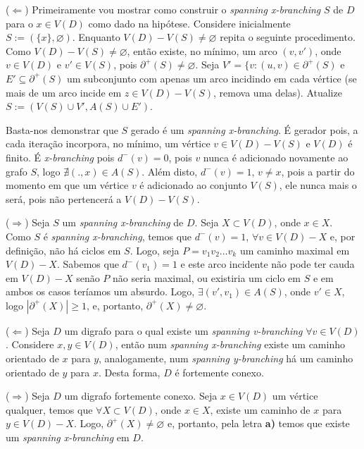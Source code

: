 
($\Leftarrow$) Primeiramente vou mostrar como construir o {\it spanning x-branching} $S$ de $D$ para o $x \in V(D)$ como dado na hipótese.
%
Considere inicialmente $S := (\{x\}, \varnothing)$.
%
Enquanto $V(D)-V(S) \ne \varnothing$ repita o seguinte procedimento.
%
Como $V(D)-V(S) \ne \varnothing$, então existe, no mínimo, um arco $(v,v')$, onde $v \in V(D)$ e $v' \in V(S)$, pois $\partial^+(S) \ne \varnothing$.
%
Seja $V' = \{v: (u,v) \in \partial^+(S)$ e $E' \subseteq \partial^+(S)$ um subconjunto com apenas um arco incidindo em cada vértice (se mais de um arco incide em $z \in V(D)-V(S)$, remova uma delas).
%
Atualize $S := (V(S)\cup V', A(S) \cup E')$.

Basta-nos demonstrar que $S$ gerado é um {\it spanning x-branching}.
%
É gerador pois, a cada iteração incorpora, no mínimo, um vértice $v \in V(D)-V(S)$ e $V(D)$ é finito.
%
É {\it x-branching} pois $d^-(v) = 0$, pois $v$ nunca é adicionado novamente ao grafo $S$, logo $\nexists (.,x) \in A(S)$.
%
Além disto, $d^-(v) = 1$, $v\ne x$, pois a partir do momento em que um vértice $v$ é adicionado ao conjunto $V(S)$, ele nunca mais o será, pois não pertencerá a $V(D)-V(S)$.

($\Rightarrow$) Seja $S$ um {\it spanning x-branching} de $D$.
%
Seja $X \subset V(D)$, onde $x \in X$. Como $S$ é {\it spanning x-branching}, temos que $d^-(v) = 1$, $\forall v \in V(D)-X$ e, por definição, não há ciclos em $S$.
%
Logo, seja $P = v_1v_2\ldots v_k$ um caminho maximal em $V(D) - X$. Sabemos que $d^-(v_1) = 1$ e este arco incidente não pode ter cauda em $V(D) - X$ senão $P$ não seria maximal, ou existiria um ciclo em $S$ e em ambos os casos teríamos um absurdo.
%
Logo, $\exists (v',v_1) \in A(S)$, onde $v' \in X$, logo $|\partial^+(X)| \ge 1$, e, portanto, $\partial^+(X) \ne \varnothing$.
\fimprova

 ($\Leftarrow$) Seja $D$ um digrafo para o qual existe um {\it spanning v-branching} $\forall v \in V(D)$.
%
Considere $x,y \in V(D)$, então num {\it spanning x-branching} existe um caminho orientado de $x$ para $y$, analogamente, num {\it spanning y-branching} há um caminho orientado de $y$ para $x$.
%
Desta forma, $D$ é fortemente conexo.

($\Rightarrow$) Seja $D$ um digrafo fortemente conexo.
%
Seja $x \in V(D)$ um vértice qualquer, temos que $\forall X \subset V(D)$, onde $x \in X$, existe um caminho de $x$ para $y \in V(D) - X$. Logo, $\partial^+(X) \ne \varnothing$ e, portanto, pela letra {\bf a)} temos que existe um {\it spanning x-branching} em $D$.

